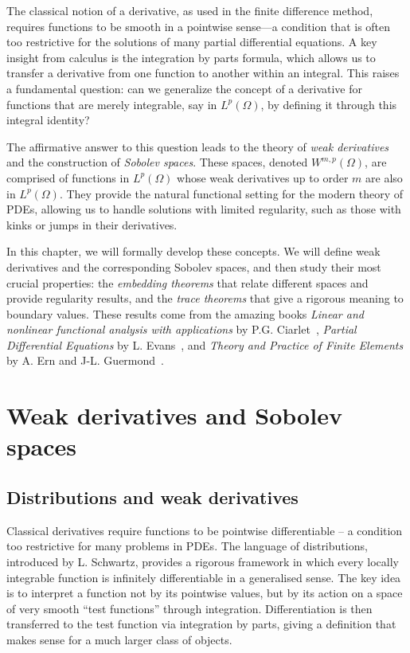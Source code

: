 The classical notion of a derivative, as used in the finite difference method, requires functions to be smooth in a pointwise sense---a condition that is often too restrictive for the solutions of many partial differential equations. A key insight from calculus is the integration by parts formula, which allows us to transfer a derivative from one function to another within an integral. This raises a fundamental question: can we generalize the concept of a derivative for functions that are merely integrable, say in $L^p(\Omega)$, by defining it through this integral identity?

The affirmative answer to this question leads to the theory of \emph{weak derivatives} and the construction of \emph{Sobolev spaces}. These spaces, denoted $W^{m,p}(\Omega)$, are comprised of functions in $L^p(\Omega)$ whose weak derivatives up to order $m$ are also in $L^p(\Omega)$. They provide the natural functional setting for the modern theory of PDEs, allowing us to handle solutions with limited regularity, such as those with kinks or jumps in their derivatives.

In this chapter, we will formally develop these concepts. We will define weak derivatives and the corresponding Sobolev spaces, and then study their most crucial properties: the \emph{embedding theorems} that relate different spaces and provide regularity results, and the \emph{trace theorems} that give a rigorous meaning to boundary values. These results come from the amazing books \emph{Linear and nonlinear functional analysis with applications} by P.G. Ciarlet~\cite{ciarlet2013linear}, \emph{Partial Differential Equations} by L. Evans~\cite{evans2022partial}, and \emph{Theory and Practice of Finite Elements} by A. Ern and J-L. Guermond~\cite{ern2004theory}.
\section{Weak derivatives and Sobolev spaces}\label{sec:weak-derivatives-sobolev-spaces}

\subsection{Distributions and weak derivatives}

Classical derivatives require functions to be pointwise differentiable – a condition too restrictive for many problems in PDEs. The language of distributions, introduced by L. Schwartz, provides a rigorous framework in which every locally integrable function is infinitely differentiable in a generalised sense. The key idea is to interpret a function not by its pointwise values, but by its action on a space of very smooth ``test functions'' through integration. Differentiation is then transferred to the test function via integration by parts, giving a definition that makes sense for a much larger class of objects.

